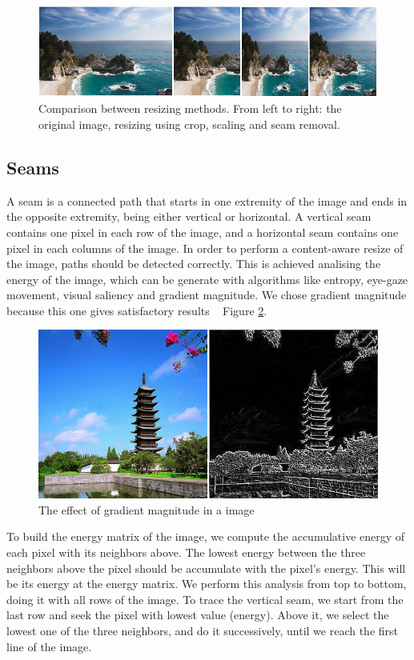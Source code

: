 \documentclass{article}
\begin{document}
	\begin{figure} [H]
		\centering
		\includegraphics[scale=0.5]{images/intelligent1}
		\caption{Comparison between resizing methods. From left to right: the original image, resizing using crop, scaling and seam removal.\label{intelligent1}}
	\end{figure}

	\subsection{Seams}
	A seam is a connected path that starts in one extremity of the image and ends in the opposite extremity, being either vertical or horizontal. A vertical seam contains one pixel in each row of the image, and a horizontal seam contains one pixel in each columns of the image. In order to perform a content-aware resize of the image, paths should be detected correctly. This is achieved analising the energy of the image, which can be generate with algorithms like entropy, eye-gaze movement, visual saliency and gradient magnitude. We chose gradient magnitude because this one gives satisfactory results ~\cite{ref:seamwiki} Figure \ref{castle}.

	\begin{figure} [H]
		\centering
		\includegraphics[scale=0.5]{images/intelligent2}
		\caption{The effect of gradient magnitude in a image\label{castle}}
	\end{figure}

	To build the energy matrix of the image, we compute the accumulative energy of each pixel with its neighbors above. The lowest energy between the three neighbors above the pixel should be accumulate with the pixel's energy. This will be its energy at the energy matrix. We perform this analysis from top to bottom, doing it with all rows of the image. To trace the vertical seam, we start from the last row and seek the pixel with lowest value (energy). Above it, we select the lowest one of the three neighbors, and do it successively, until we reach the first line of the image.
\end{document}
